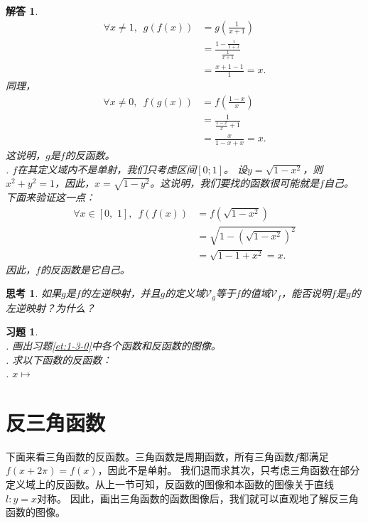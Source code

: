 \documentclass[12pt,UTF8]{ctexbook}
\newtheorem{sk}{思考}[section]
\newtheorem*{so}{解答}
\newtheorem{xt}{习题}[section]
\begin{document}
\begin{so}
\begin{align*}
        \forall x\neq 1, \,\,\, g(f(x)) &= g\left(\frac{1}{x+1}\right)  \\
                                  &= \frac{1 - \frac{1}{1 + x}}{\frac{1}{x + 1}}  \\
                                  &= \frac{x + 1 - 1}{1} = x. 
    \end{align*} 
    同理，
    \begin{align*}
        \forall x \neq 0, \,\,\, f(g(x)) &= f\left(\frac{1 - x}{x}\right)  \\
                                  &= \frac{1}{\frac{1 - x}{x} + 1}  \\
                                  &= \frac{x}{1 - x + x} = x. 
    \end{align*} 
    这说明，$g$是$f$的反函数。\\  
    . $f$在其定义域内不是单射，我们只考虑区间$[0;1]$。
    设$y = \sqrt{1 - x^2}$，则$x^2 + y^2 = 1$，因此，$x = \sqrt{1 - y^2}$。这说明，我们要找的函数很可能就是$f$自己。
    下面来验证这一点：
    \begin{align*}
        \forall x\in [0,\,\,1], \,\,\, f(f(x)) &= f\left(\sqrt{1 - x^2}\right)  \\
                                  &= \sqrt{1 - \left(\sqrt{1 - x^2}\right)^2}  \\
                                  &= \sqrt{1 - 1 + x^2} = x. 
    \end{align*} 
    因此，$f$的反函数是它自己。
\end{so}

\begin{sk}
    如果$g$是$f$的左逆映射，并且$g$的定义域$\mathcal{V}_g$等于$f$的值域$\mathcal{V}_f$，能否说明$f$是$g$的左逆映射？为什么？
\end{sk}
\begin{xt}
    \mbox{} \\
    . 画出习题\ref{et:1-3-0}中各个函数和反函数的图像。\\
    . 求以下函数的反函数：\\
    . $x\mapsto $
\end{xt}

\section{反三角函数}

下面来看三角函数的反函数。三角函数是周期函数，所有三角函数$f$都满足$f(x+2\pi) = f(x)$，因此不是单射。
我们退而求其次，只考虑三角函数在部分定义域上的反函数。从上一节可知，反函数的图像和本函数的图像关于直线$l: y = x$对称。
因此，画出三角函数的函数图像后，我们就可以直观地了解反三角函数的图像。
\end{document}

